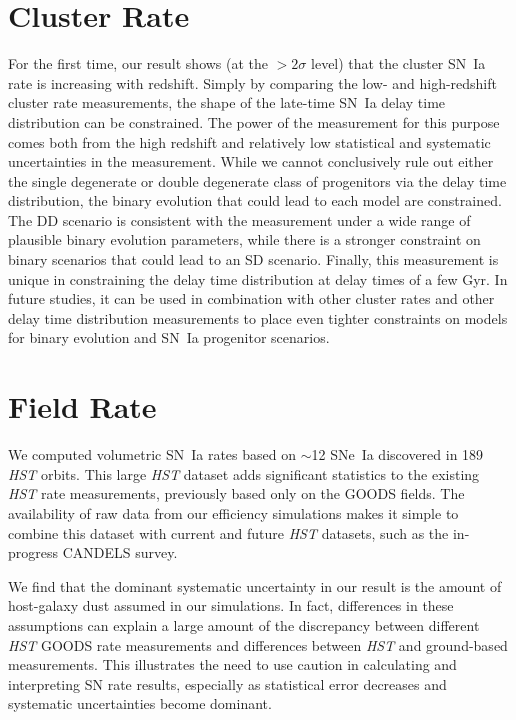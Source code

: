 \section{Cluster Rate}

For the first time, our result shows (at the $>2\sigma$ level) that
the cluster SN~Ia rate is increasing with redshift.  Simply by
comparing the low- and high-redshift cluster rate measurements, the
shape of the late-time SN~Ia delay time distribution can be
constrained. The power of the measurement for this purpose comes both
from the high redshift and relatively low statistical and systematic
uncertainties in the measurement. While we cannot conclusively rule
out either the single degenerate or double degenerate class of
progenitors via the delay time distribution, the binary evolution that
could lead to each model are constrained. The DD scenario is
consistent with the measurement under a wide range of plausible binary
evolution parameters, while there is a stronger constraint on binary
scenarios that could lead to an SD scenario. Finally, this measurement
is unique in constraining the delay time distribution at delay times
of a few Gyr. In future studies, it can be used in combination with
other cluster rates and other delay time distribution
measurements \citep[e.g.,][]{maoz10c} to place even tighter
constraints on models for binary evolution and SN~Ia progenitor
scenarios.

\section{Field Rate}

We computed volumetric SN~Ia rates based on $\sim$12 SNe~Ia discovered
in 189 \emph{HST} orbits. This large \emph{HST} dataset adds
significant statistics to the existing \emph{HST} rate measurements,
previously based only on the GOODS fields. The availability of raw
data from our efficiency simulations makes it simple to combine this
dataset with current and future \emph{HST} datasets, such as the
in-progress CANDELS survey.

We find that the dominant systematic uncertainty in our result is the
amount of host-galaxy dust assumed in our simulations. In fact,
differences in these assumptions can explain a large amount of the
discrepancy between different \emph{HST} GOODS rate measurements and
differences between \emph{HST} and ground-based measurements. This
illustrates the need to use caution in calculating and interpreting SN
rate results, especially as statistical error decreases and systematic
uncertainties become dominant.

